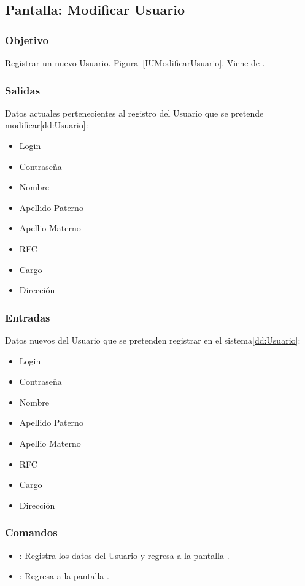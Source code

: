 \subsection{Pantalla: Modificar Usuario}
\subsubsection{Objetivo}
Registrar un nuevo Usuario. Figura~\ref{IUModificarUsuario}. Viene de .



\subsubsection{Salidas}
Datos actuales pertenecientes al registro del Usuario que se pretende modificar\ref{dd:Usuario}:
\begin{itemize}
 \item Login
 \item Contraseña
 \item Nombre
 \item Apellido Paterno
 \item Apellio Materno
 \item RFC
 \item Cargo
 \item Dirección
\end{itemize}

\subsubsection{Entradas}
Datos nuevos del Usuario que se pretenden registrar en el sistema\ref{dd:Usuario}:
\begin{itemize}
 \item Login
 \item Contraseña
 \item Nombre
 \item Apellido Paterno
 \item Apellio Materno
 \item RFC
 \item Cargo
 \item Dirección
\end{itemize}

\subsubsection{Comandos}
\begin{itemize}
 \item {}: Registra los datos del Usuario y regresa a la pantalla .
 \item {}: Regresa a la pantalla .
\end{itemize}